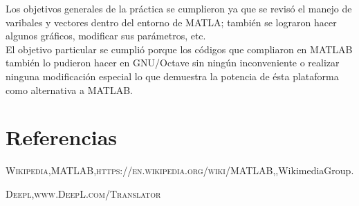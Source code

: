 \documentclass[]{article}
\begin{document}
Los objetivos generales de la práctica se cumplieron ya que se revisó el manejo de varibales y vectores dentro del entorno de MATLA; también se lograron hacer algunos gráficos, modificar sus parámetros, etc.\\

El objetivo particular se cumplió porque los códigos que compliaron en MATLAB también lo pudieron hacer en GNU/Octave sin ningún inconveniente o realizar ninguna modificación especial lo que demuestra la potencia de ésta plataforma como alternativa a MATLAB.\\

%
%
%
\section{Referencias}

\begin{thebibliography}{widestlabel}
	\textsc{Wikipedia},\textsc{MATLAB},\textsc{https://en.wikipedia.org/wiki/MATLAB},\textit{},WikimediaGroup.
	
   \textsc{Deepl},\textsc{www.DeepL.com/Translator}
	
	
	
\end{thebibliography}
\end{document}
